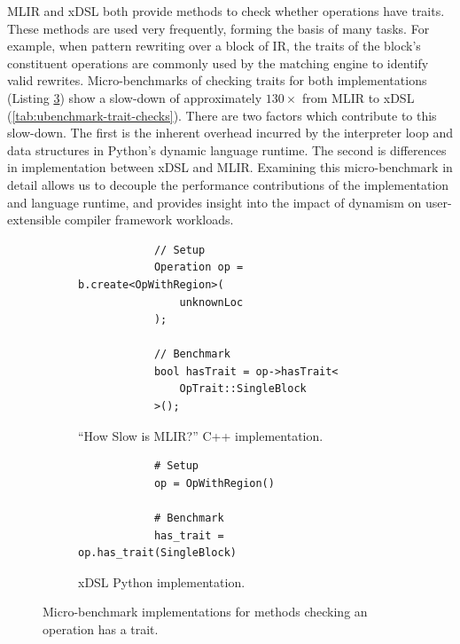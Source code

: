MLIR and xDSL both provide methods to check whether operations have traits.
These methods are used very frequently, forming the basis of many tasks. For example, when pattern rewriting over a block of IR, the traits of the block's constituent operations are commonly used by the matching engine to identify valid rewrites.
Micro-benchmarks of checking traits for both implementations (Listing \ref{listing:ubenchmark-trait-checks-bench}) show a slow-down of approximately $130\times$ from MLIR to xDSL (\autoref{tab:ubenchmark-trait-checks}). There are two factors which contribute to this slow-down. The first is the inherent overhead incurred by the interpreter loop and data structures in Python's dynamic language runtime. The second is differences in implementation between xDSL and MLIR.
Examining this micro-benchmark in detail allows us to decouple the performance contributions of the implementation and language runtime, and provides insight into the impact of dynamism on user-extensible compiler framework workloads.

\begin{figure}[H]
    \centering
    \begin{subfigure}[b]{0.45\textwidth}
       \centering
        \begin{verbatim}
            // Setup
            Operation op = b.create<OpWithRegion>(
                unknownLoc
            );

            // Benchmark
            bool hasTrait = op->hasTrait<
                OpTrait::SingleBlock
            >();
        \end{verbatim}
        \caption{``How Slow is MLIR?'' C++ implementation.}
        \label{listing:ubenchmark-trait-checks-bench-mlir}
    \end{subfigure}
    \hfill
    \begin{subfigure}[b]{0.45\textwidth}
        \centering
        \begin{verbatim}
            # Setup
            op = OpWithRegion()

            # Benchmark
            has_trait = op.has_trait(SingleBlock)
        \end{verbatim}
        \footnotesize\vspace{2em}
        \caption{xDSL Python implementation.}
        \label{listing:ubenchmark-trait-checks-bench-xdsl}
    \end{subfigure}
    \vspace{1em}
    \captionsetup{name=Listing}
    \caption{Micro-benchmark implementations for methods checking an operation has a trait.}
    \label{listing:ubenchmark-trait-checks-bench}
\end{figure}


